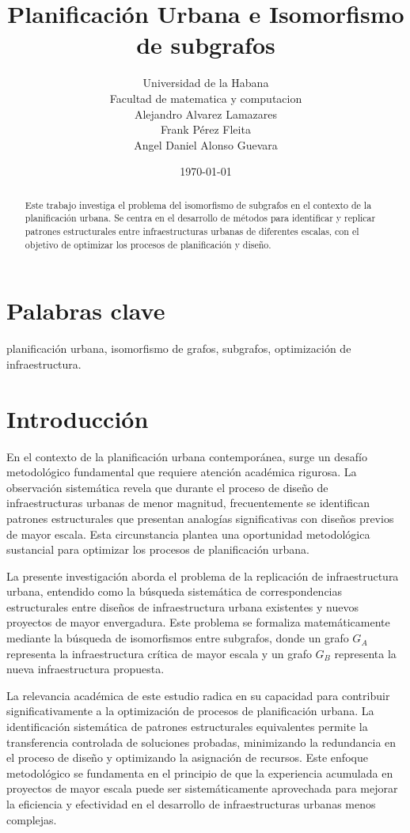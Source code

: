 \documentclass[12pt,a4paper]{article}
\title{Planificación Urbana e Isomorfismo de subgrafos}
\author{
    Universidad de la Habana\\
    Facultad de matematica y computacion\\
    Alejandro Alvarez Lamazares\\
    Frank Pérez Fleita\\
    Angel Daniel Alonso Guevara \\
}
\date{\today}
\begin{document}
\maketitle
\begin{abstract}
Este trabajo investiga el problema del isomorfismo de subgrafos en el contexto de la planificación urbana. Se centra en el desarrollo de métodos para identificar y replicar patrones estructurales entre infraestructuras urbanas de diferentes escalas, con el objetivo de optimizar los procesos de planificación y diseño.
\end{abstract}

\section*{Palabras clave}
planificación urbana, isomorfismo de grafos, subgrafos, optimización de infraestructura.

\section{Introducción}
En el contexto de la planificación urbana contemporánea, surge un desafío metodológico fundamental que requiere atención académica rigurosa. La observación sistemática revela que durante el proceso de diseño de infraestructuras urbanas de menor magnitud, frecuentemente se identifican patrones estructurales que presentan analogías significativas con diseños previos de mayor escala. Esta circunstancia plantea una oportunidad metodológica sustancial para optimizar los procesos de planificación urbana.

La presente investigación aborda el problema de la replicación de infraestructura urbana, entendido como la búsqueda sistemática de correspondencias estructurales entre diseños de infraestructura urbana existentes y nuevos proyectos de mayor envergadura. Este problema se formaliza matemáticamente mediante la búsqueda de isomorfismos entre subgrafos, donde un grafo $G_A$  representa la infraestructura crítica de mayor escala y un grafo $G_B$ representa la nueva infraestructura propuesta.

La relevancia académica de este estudio radica en su capacidad para contribuir significativamente a la optimización de procesos de planificación urbana. La identificación sistemática de patrones estructurales equivalentes permite la transferencia controlada de soluciones probadas, minimizando la redundancia en el proceso de diseño y optimizando la asignación de recursos. Este enfoque metodológico se fundamenta en el principio de que la experiencia acumulada en proyectos de mayor escala puede ser sistemáticamente aprovechada para mejorar la eficiencia y efectividad en el desarrollo de infraestructuras urbanas menos complejas.
\end{document}
